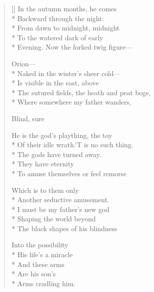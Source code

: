 \label{ch:lear_be}
\settowidth{\versewidth}{Of their idle wrath.\qquad `T is no such thing.}
\begin{verse}[\versewidth]
In the autumn months, he comes\\*
Backward through the night:\\*
From dawn to midnight, midnight\\*
To the watered dark of early\\*
Evening.   Now the forked twig figure---

\hspace*{3\vgap} Orion---\\*
Naked in the winter's sheer cold---\\*
Is visible in the east, above\\*
The sutured fields, the heath and peat bogs,\\*
Where somewhere my father wanders,

Blind, sure

He is the god's plaything, the toy\\*
Of their idle wrath.\qquad `T is no such thing.\\*
The gods have turned away.\\*
They have eternity\\*
To amuse themselves or feel remorse

Which is to them only\\*
Another seductive amusement.\\*
I must be my father's new god\\*
Shaping the world beyond\\*
The black shapes of his blindness

Into the possibility\\*
His life's a miracle\\*
And these arms\\*
Are his son's\\*
Arms cradling him.
\end{verse}

